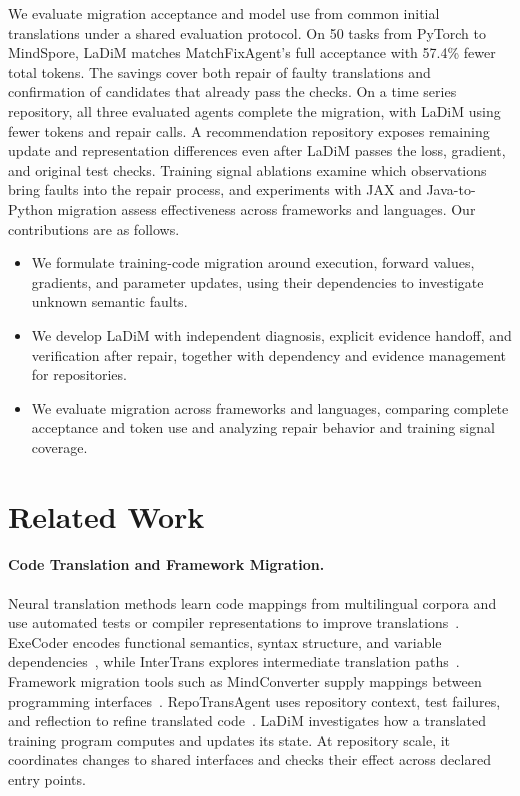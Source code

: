 \documentclass{article}
\begin{document}
We evaluate migration acceptance and model use from common initial translations under a shared evaluation protocol. On 50 tasks from PyTorch to MindSpore, LaDiM matches MatchFixAgent's full acceptance with 57.4\% fewer total tokens. The savings cover both repair of faulty translations and confirmation of candidates that already pass the checks. On a time series repository, all three evaluated agents complete the migration, with LaDiM using fewer tokens and repair calls. A recommendation repository exposes remaining update and representation differences even after LaDiM passes the loss, gradient, and original test checks. Training signal ablations examine which observations bring faults into the repair process, and experiments with JAX and Java-to-Python migration assess effectiveness across frameworks and languages. Our contributions are as follows.

\begin{itemize}
  \item We formulate training-code migration around execution, forward values, gradients, and parameter updates, using their dependencies to investigate unknown semantic faults.
  \item We develop LaDiM with independent diagnosis, explicit evidence handoff, and verification after repair, together with dependency and evidence management for repositories.
  \item We evaluate migration across frameworks and languages, comparing complete acceptance and token use and analyzing repair behavior and training signal coverage.
\end{itemize}

\section{Related Work}

\paragraph{Code Translation and Framework Migration.}
Neural translation methods learn code mappings from multilingual corpora and use automated tests or compiler representations to improve translations~\citep{roziere2020transcoder,roziere2021unittests,szafraniec2023compiler}. ExeCoder encodes functional semantics, syntax structure, and variable dependencies~\citep{he-etal-2025-execoder}, while InterTrans explores intermediate translation paths~\citep{macedo2024intertrans}. Framework migration tools such as MindConverter supply mappings between programming interfaces~\citep{mindspore2023mindconverter}. RepoTransAgent uses repository context, test failures, and reflection to refine translated code~\citep{guan2025repotransagent}. LaDiM investigates how a translated training program computes and updates its state. At repository scale, it coordinates changes to shared interfaces and checks their effect across declared entry points.
\end{document}
